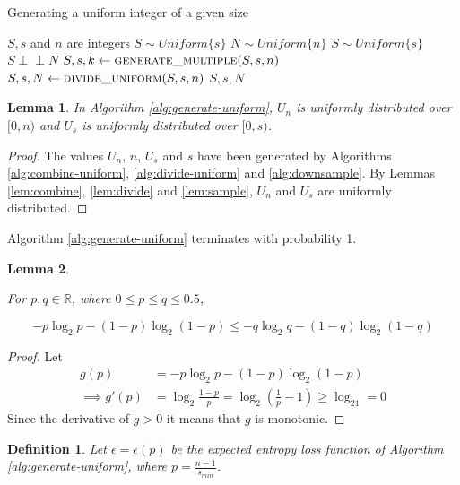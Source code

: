 \documentclass[12pt]{article}
\newtheorem{lemma}{Lemma}
\newtheorem{definition}{Definition}
\newcommand{\indep}{\perp\!\!\!\perp}
\begin{document}
\begin{algorithm}
\caption{Generating a uniform integer of a given size}
\label{alg:generate-uniform}
\begin{algorithmic}[1]
\Require $S, s$ and $n$ are integers
\Require $S \sim Uniform\{s\}$
\Ensure $N \sim Uniform\{n\}$
\Ensure $S \sim Uniform\{s\}$
\Ensure $S \indep N$
  \State $S, s, k \gets \textsc{generate\_multiple}(S, s, n)$
  \State $S, s, N \gets \textsc{divide\_uniform}(S, s, n)$
  \State \Return $S, s, N$
\EndProcedure
\end{algorithmic}
\end{algorithm}

\begin{lemma}
    In Algorithm \ref{alg:generate-uniform}, 
$U_n$ is uniformly distributed over $[0,n)$ and 
$U_s$ is uniformly distributed over $[0,s)$.
\end{lemma}

\begin{proof}
The values $U_n$, $n$, $U_s$ and $s$ have been generated by Algorithms \ref{alg:combine-uniform}, \ref{alg:divide-uniform} and \ref{alg:downsample}. By Lemmas \ref{lem:combine}, \ref{lem:divide} and \ref{lem:sample}, $U_n$ and $U_s$ are uniformly distributed.
\end{proof}

Algorithm \ref{alg:generate-uniform} terminates with probability 1.

\begin{lemma}
    \label{lem:shannon-inequality}

For $p,q \in \mathbb{R}$, where $0 \le p\le q \le 0.5$, 

\begin{equation}
-p\log_2 p - (1-p)\log_2(1-p) \le -q\log_2 q - (1-q)\log_2(1-q)
\end{equation}
\end{lemma}

\begin{proof}
    Let
    \begin{align}
        g(p) & = -p\log_2 p - (1-p)\log_2(1-p) \\
        \implies g'(p) & = \log_2\frac{1-p}{p} = \log_2(\frac{1}{p}-1) \ge \log_21 = 0 
    \end{align}
Since the derivative of $g>0$ it means that $g$ is monotonic.
\end{proof}

\begin{definition}
    Let $\epsilon = \epsilon(p)$ be the expected entropy loss function of Algorithm \ref{alg:generate-uniform}, where $p=\frac{n-1}{s_{min}}$.
\end{definition}
\end{document}
